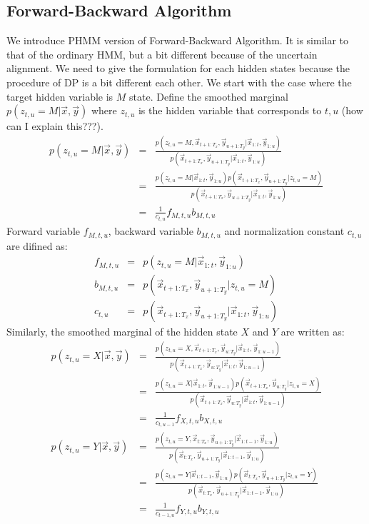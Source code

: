 \subsection{Forward-Backward Algorithm}
We introduce PHMM version of Forward-Backward Algorithm. 
It is similar to that of the ordinary HMM, but a bit different because of the uncertain alignment. 
We need to give the formulation for each hidden states because the procedure of DP is a bit different each other.
We start with the case where the target hidden variable is $M$ state. 
Define the smoothed marginal $p(z_{t, u} = M | \vec{x}, \vec{y})$ where $z_{t, u}$ is the hidden variable that corresponds to $t, u$ (how can I explain this???).
\begin{eqnarray}
p(z_{t,u} = M | \vec{x}, \vec{y}) &=& \frac{ p(z_{t, u}=M, \vec{x}_{t+1:T_x}, \vec{y}_{u+1:T_y}| \vec{x}_{1:t}, \vec{y}_{1:u}) } {p(\vec{x}_{t+1:T_x}, \vec{y}_{u+1:T_y}| \vec{x}_{1:t}, \vec{y}_{1:u})} \nonumber\\
                            &=& \frac{ p(z_{t, u}=M | \vec{x}_{1:t}, \vec{y}_{1:u}) p(\vec{x}_{t+1:T_x}, \vec{y}_{u+1:T_y} | z_{t, u}= M) } {p(\vec{x}_{t+1:T_x}, \vec{y}_{u+1:T_y}| \vec{x}_{1:t}, \vec{y}_{1:u})} \nonumber \\
                            &=& \frac{1}{c_{t,u}} f_{M, t, u} b_{M, t, u}
\end{eqnarray}
Forward variable $f_{M, t, u}$, backward variable $b_{M, t, u}$ and normalization constant $c_{t, u}$ are difined as:
\begin{eqnarray}
  f_{M, t, u} &=& p(z_{t, u}=M | \vec{x}_{1:t}, \vec{y}_{1:u}) \\
  b_{M, t, u} &=& p(\vec{x}_{t+1:T_x}, \vec{y}_{u+1:T_y} | z_{t, u}= M) \\
  c_{t, u}    &=& p(\vec{x}_{t+1:T_x}, \vec{y}_{u+1:T_y}| \vec{x}_{1:t}, \vec{y}_{1:u})
\end{eqnarray}
Similarly, the smoothed marginal of the hidden state $X$ and $Y$ are written as:
\begin{eqnarray}
p(z_{t,u} = X | \vec{x}, \vec{y}) &=& \frac{ p(z_{t, u}=X, \vec{x}_{t+1:T_x}, \vec{y}_{u:T_y}| \vec{x}_{1:t}, \vec{y}_{1:u-1}) } {p(\vec{x}_{t+1:T_x}, \vec{y}_{u:T_y}| \vec{x}_{1:t}, \vec{y}_{1:u-1})} \nonumber\\
                            &=& \frac{ p(z_{t, u}=X | \vec{x}_{1:t}, \vec{y}_{1:u-1}) p(\vec{x}_{t+1:T_x}, \vec{y}_{u:T_y} | z_{t, u}= X) } {p(\vec{x}_{t+1:T_x}, \vec{y}_{u:T_y}| \vec{x}_{1:t}, \vec{y}_{1:u-1})} \nonumber \\
                            &=& \frac{1}{c_{t,u-1}} f_{X, t, u} b_{X, t, u} \\
p(z_{t,u} = Y | \vec{x}, \vec{y}) &=& \frac{ p(z_{t, u}=Y, \vec{x}_{t:T_x}, \vec{y}_{u+1:T_y}| \vec{x}_{1:t-1}, \vec{y}_{1:u}) } {p(\vec{x}_{t:T_x}, \vec{y}_{u+1:T_y}| \vec{x}_{1:t-1}, \vec{y}_{1:u})} \nonumber\\
                            &=& \frac{ p(z_{t, u}=Y | \vec{x}_{1:t-1}, \vec{y}_{1:u}) p(\vec{x}_{t:T_x}, \vec{y}_{u+1:T_y} | z_{t, u}= Y) } {p(\vec{x}_{t:T_x}, \vec{y}_{u+1:T_y}| \vec{x}_{1:t-1}, \vec{y}_{1:u})} \nonumber \\
                            &=& \frac{1}{c_{t-1,u}} f_{Y, t, u} b_{Y, t, u}
\end{eqnarray}
